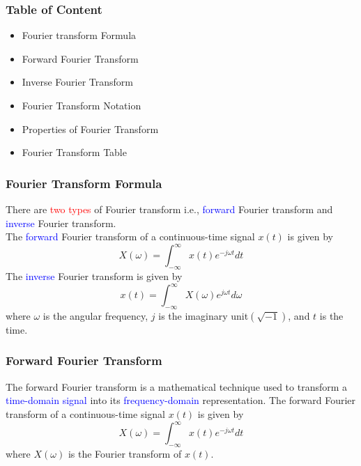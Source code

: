 \documentclass{beamer}
\begin{document}
\begin{frame}
    \frametitle{Table of Content}
    \begin{itemize}[label=$\star$, itemsep=15pt, parsep=0pt, topsep=10pt]
        \item <1-> Fourier transform Formula
        \item <2-> Forward Fourier Transform
        \item <3-> Inverse Fourier Transform
        \item <4-> Fourier Transform Notation
        \item <5-> Properties of Fourier Transform
        \item <6-> Fourier Transform Table
    \end{itemize}
\end{frame}

\begin{frame}
    \frametitle{Fourier Transform Formula}
    There are \textcolor{red}{two types} of Fourier transform i.e., \textcolor{blue}{forward} Fourier transform and \textcolor{blue}{inverse} Fourier transform.\\
    The \textcolor{blue}{forward} Fourier transform of a continuous-time signal $x(t)$ is given by
    \begin{equation*}
        X(\omega) = \int_{-\infty}^{\infty} x(t) e^{-j\omega t} dt
    \end{equation*}
    The \textcolor{blue}{inverse} Fourier transform is given by
    \begin{equation*}
        x(t) = \int_{-\infty}^{\infty} X(\omega) e^{j\omega t} d\omega
    \end{equation*}
    where $\omega$ is the angular frequency, $j$ is the imaginary unit$(\sqrt{-1})$, and $t$ is the time.
\end{frame}

\begin{frame}
    \frametitle{Forward Fourier Transform}
    The forward Fourier transform is a mathematical technique used to transform a \textcolor{blue}{time-domain signal} into its \textcolor{blue}{frequency-domain} representation.
    The forward Fourier transform of a continuous-time signal $x(t)$ is given by
    \begin{equation*}
        X(\omega) = \int_{-\infty}^{\infty} x(t) e^{-j\omega t} dt
    \end{equation*}
    where $X(\omega)$ is the Fourier transform of $x(t)$.
\end{frame}
\end{document}
